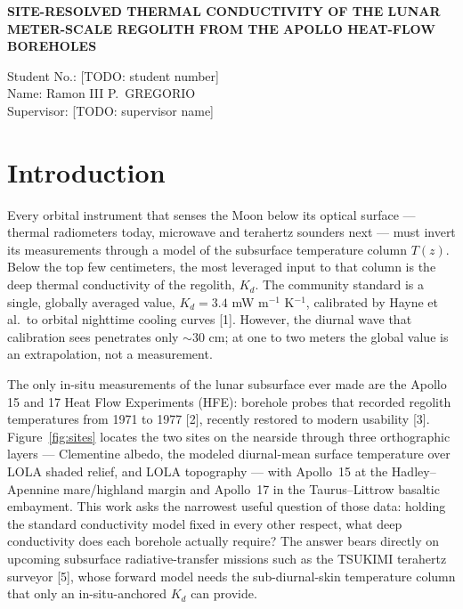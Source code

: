 \documentclass[10pt,a4paper]{article}
\begin{document}
\begin{center}
{\fontsize{14}{17}\selectfont\bfseries
SITE-RESOLVED THERMAL CONDUCTIVITY OF THE LUNAR METER-SCALE REGOLITH
FROM THE APOLLO HEAT-FLOW BOREHOLES}
\end{center}
\vspace{\baselineskip}

\begin{flushright}
Student No.: [TODO: student number]\\
Name: Ramon III P.\ GREGORIO\\
Supervisor: [TODO: supervisor name]
\end{flushright}
\vspace{2\baselineskip}

\section{Introduction}
Every orbital instrument that senses the Moon below its optical surface
--- thermal radiometers today, microwave and terahertz sounders next ---
must invert its measurements through a model of the subsurface
temperature column $T(z)$. Below the top few centimeters, the most
leveraged input to that column is the deep thermal conductivity of the
regolith, $K_d$. The community standard is a single, globally averaged
value, $K_d = 3.4$ mW m$^{-1}$ K$^{-1}$, calibrated by Hayne et al.\ to
orbital nighttime cooling curves [1]. However, the diurnal wave that
calibration sees penetrates only ${\sim}30$ cm; at one to two meters
the global value is an extrapolation, not a measurement.

The only in-situ measurements of the lunar subsurface ever made are the
Apollo 15 and 17 Heat Flow Experiments (HFE): borehole probes that
recorded regolith temperatures from 1971 to 1977 [2], recently restored
to modern usability [3]. Figure~\ref{fig:sites} locates the two sites
on the nearside through three orthographic layers --- Clementine albedo,
the modeled diurnal-mean surface temperature over LOLA shaded relief,
and LOLA topography --- with Apollo~15 at the Hadley--Apennine
mare/highland margin and Apollo~17 in the Taurus--Littrow basaltic
embayment. This work asks the narrowest useful question of those data:
holding the standard conductivity model fixed in every other respect,
what deep conductivity does each borehole actually require? The answer
bears directly on upcoming subsurface radiative-transfer missions such
as the TSUKIMI terahertz surveyor [5], whose forward model needs the
sub-diurnal-skin temperature column that only an in-situ-anchored $K_d$
can provide.
\end{document}
